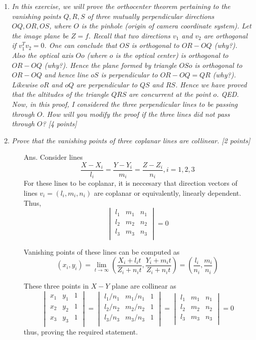 \documentclass[11pt]{article}
\begin{document}
\begin{enumerate}
\item \textit{In this exercise, we will prove the orthocenter theorem pertaining to the vanishing points $Q,R,S$ of three mutually perpendicular directions $OQ, OR, OS$, where $O$ is the pinhole (origin of camera coordinate system). Let the image plane be $Z = f$. Recall that two directions $v_1$ and $v_2$ are orthogonal if $v^T_1 v_2 = 0$. One can conclude that $OS$ is orthogonal to $OR-OQ$ (why?). Also the optical axis $Oo$ (where $o$ is the optical center) is orthogonal to $OR-OQ$ (why?). Hence the plane formed by triangle $OSo$ is orthogonal to $OR-OQ$ and hence line $oS$ is perpendicular to $OR-OQ = QR$ (why?). Likewise $oR$ and $oQ$ are perpendicular to $QS$ and $RS$. Hence we have proved that the altitudes of the triangle $QRS$ are concurrent at the point $o$. QED. Now, in this proof, I considered the three perpendicular lines to be passing through $O$. How will you modify the proof if the three lines did not pass through $O$? \textsf{[4 points]}}

\item \textit{Prove that the vanishing points of three coplanar lines are collinear. \textsf{[2 points]}}
\begin{itemize}
	\item[Ans.] Consider lines 
	\[
		\frac{X-X_i}{l_i} = \frac{Y-Y_i}{m_i} = \frac{Z-Z_i}{n_i}, i = 1,2,3
	\]
	For these lines to be coplanar, it is neccesary that direction vectors of lines $v_i = (l_i,m_i,n_i)$ are coplanar or equivalently, linearly dependent. Thus,
		\[
		\begin{vmatrix}
		l_1& m_1& n_1	\\
		l_2& m_2& n_2	\\
		l_3& m_3& n_3	\\	
		\end{vmatrix}
		  = 0
		\]

	Vanishing points of these lines can be computed as
	\[
		(x_i,y_i) = \lim_{t \to \infty} \left (\frac{X_i+l_it}{Z_i+n_it},\frac{Y_i+m_it}{Z_i+n_it}\right )
				  = \left (\frac{l_i}{n_i}, \frac{m_i}{n_i}\right )
	\]

	These three points in $X-Y$ plane are collinear as 
	\[
		\begin{vmatrix}
		x_1& y_1& 1	\\
		x_2& y_2& 1	\\
		x_3& y_3& 1 \\	
		\end{vmatrix}
		  = 
		\begin{vmatrix}
		l_1/n_1& m_1/n_1& 1	\\
		l_2/n_2& m_2/n_2& 1	\\
		l_3/n_3& m_3/n_3& 1	\\	
		\end{vmatrix}
		  =		
		\begin{vmatrix}
		l_1& m_1& n_1	\\
		l_2& m_2& n_2	\\
		l_3& m_3& n_3	\\	
		\end{vmatrix}
		  = 0
	\]
	thus, proving the required statement.
\end{itemize}


\end{enumerate}
\end{document}
